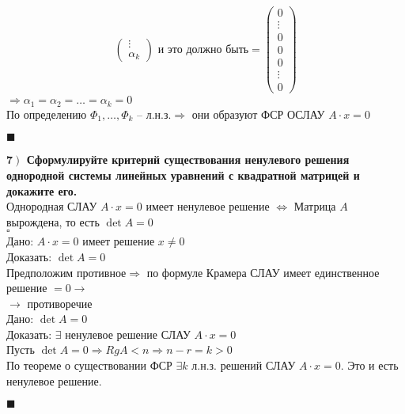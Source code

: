 \documentclass[a4paper,12pt]{article}
\begin{document}
\begin{align*}
\begin{pmatrix}
              \vdots   \\
              \alpha_k
        \end{pmatrix}\text{ и это должно быть}=\begin{pmatrix}
                                                   0      \\
                                                   \vdots \\
                                                   0      \\
                                                   0      \\
                                                   0      \\
                                                   \vdots \\
                                                   0
        \end{pmatrix}
    \end{align*}
    $\Rightarrow\alpha_1=\alpha_2=\ldots=\alpha_k=0$\\
    По определению $\Phi_1, \ldots, \Phi_k$ -- л.н.з.$\Rightarrow$ они образуют ФСР ОСЛАУ $A\cdot x=0$
    \begin{flushright}
        $\blacksquare$
    \end{flushright}

    \textbf{7$\left.\right)$ Сформулируйте критерий существования ненулевого решения однородной системы линейных уравнений с квадратной матрицей и докажите его.}\\
    Однородная СЛАУ $A\cdot x=0$ имеет ненулевое решение $\Leftrightarrow$ Матрица $A$ вырождена, то есть $\det A=0$\\
    $\square$\\
    Дано: $A\cdot x=0$ имеет решение $x\ne0$\\
    Доказать: $\det A=0$\\
    Предположим противное$\Rightarrow$ по формуле Крамера СЛАУ имеет единственное решение $=0\rightarrow$\\$\rightarrow$ противоречие\\
    Дано: $\det A=0$\\
    Доказать: $\exists$ ненулевое решение СЛАУ $A\cdot x=0$\\
    Пусть $\det A=0\Rightarrow RgA<n\Rightarrow n-r=k>0$\\
    По теореме о существовании ФСР $\exists k$ л.н.з. решений СЛАУ $A\cdot x=0$. Это и есть ненулевое решение.
    \begin{flushright}
        $\blacksquare$
    \end{flushright}
\end{document}
